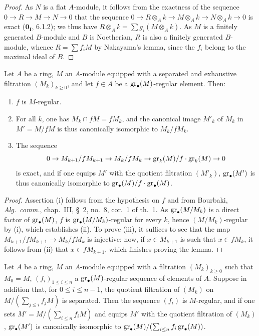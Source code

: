 \begin{proof}
As $N$ is a flat $A$-module, it follows from the exactness of the sequence $0\to R\to M\to N\to 0$ that the sequence $0\to R\otimes_Ak\to M\otimes_Ak\to N\otimes_Ak\to 0$ is exact ($\mathbf{0_I}$, 6.1.2);
we thus have $R\otimes_Ak=\sum g_i(M\otimes_Ak)$.
As $M$ is a finitely generated $B$-module and $B$ is Noetherian, $R$ is also a finitely generated $B$-module, whence $R=\sum f_iM$ by Nakayama's lemma, since the $f_i$ belong to the maximal ideal of $B$.
\end{proof}

\begin{lemma}[15.1.18]
\label{0.15.1.18}
Let $A$ be a ring, $M$ an $A$-module equipped with a separated and exhaustive filtration $(M_k)_{k\geq 0}$, and let $f\in A$ be a $\operatorname{gr}_\bullet(M)$-regular element.
Then:
\begin{enumerate}
  \item[(i)] $f$ is $M$-regular.
  \item[(ii)] For all $k$, one has $M_k\cap fM=fM_k$, and the canonical image $M'_k$ of $M_k$ in $M'=M/fM$ is thus canonically isomorphic to $M_k/fM_k$.
  \item[(iii)] The sequence
  \[
    0 \to M_{k+1}/fM_{k+1} \to M_k/fM_k \to \operatorname{gr}_k(M)/f\cdot\operatorname{gr}_k(M) \to 0
  \]
  is exact, and if one equips $M'$ with the quotient filtration $(M'_k)$, $\operatorname{gr}_\bullet(M')$ is thus canonically isomorphic to $\operatorname{gr}_\bullet(M)/f\cdot\operatorname{gr}_\bullet(M)$.
\end{enumerate}
\end{lemma}

\begin{proof}
Assertion (i) follows from the hypothesis on $f$ and from Bourbaki, \emph{Alg.~comm.}, chap.~III, \S~2, no.~8, cor.~1 of th.~1.
As $\operatorname{gr}_\bullet(M/M_k)$ is a direct factor of $\operatorname{gr}_\bullet(M)$, $f$ is $\operatorname{gr}_\bullet(M/M_k)$-regular for every $k$, hence $(M/M_k)$-regular by (i), which establishes (ii).
To prove (iii), it suffices to see that the map $M_{k+1}/fM_{k+1}\to M_k/fM_k$ is injective:
now, if $x\in M_{k+1}$ is such that $x\in fM_k$, it follows from (ii) that $x\in fM_{k+1}$, which finishes proving the lemma.
\end{proof}

\begin{proposition}[15.1.19]
\label{0.15.1.19}
Let $A$ be a ring, $M$ an $A$-module equipped with a filtration $(M_k)_{k\geq 0}$ such that $M_0=M$, $(f_i)_{1\leq i\leq n}$ a $\operatorname{gr}_\bullet(M)$-regular sequence of elements of $A$.
Suppose in addition that, for $0\leq i\leq n-1$, the quotient filtration of $(M_k)$ on $M/(\sum_{j\leq i}f_jM)$ is separated.
Then the sequence $(f_i)$ is $M$-regular, and if one sets $M'=M/(\sum_{i\leq n}f_iM)$ and equips $M'$ with the quotient filtration of $(M_k)$, $\operatorname{gr}_\bullet(M')$ is canonically isomorphic to $\operatorname{gr}_\bullet(M)/(\sum_{i\leq n}f_i\operatorname{gr}_\bullet(M))$.
\end{proposition}

